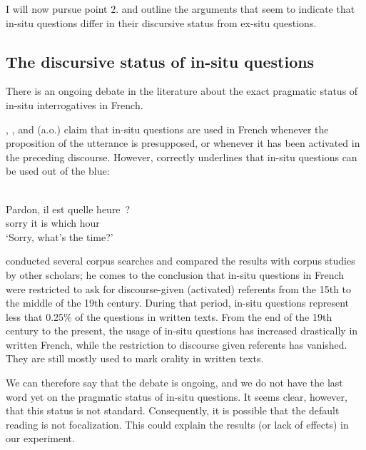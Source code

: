 I will now pursue point 2. and outline the arguments that seem to indicate that in-situ questions differ in their discursive status from ex-situ questions.

\subsection{The discursive status of in-situ questions}

There is an ongoing debate in the literature about the exact pragmatic status of in-situ interrogatives in French. 

\citet{Coveney.1996}, \citet{Boeckx.1999}, \citet{Cheng.2000} and \citet{Beyssade.2006} (a.o.) claim that in-situ questions are used in French whenever the proposition of the utterance is presupposed, or whenever it has been activated in the preceding discourse. However, \citet{Adli.2006} correctly underlines that in-situ questions can be used out of the blue:

\ea \citep[184]{Adli.2006}\nopagebreak\\
\gll Pardon, il est quelle heure~?\\
sorry it is which hour\\
\glt `Sorry, what's the time?'
\z 

\citet{Larrivee.2016} conducted several corpus searches and compared the results with corpus studies by other scholars; he comes to the conclusion that in-situ questions in French were restricted to ask for discourse-given (activated) referents from the 15th to the middle of the 19th century. During that period, in-situ questions represent less that 0.25\% of the questions in written texts. From the end of the 19th century to the present, the usage of in-situ questions has increased drastically in written French, while the restriction to discourse given referents has vanished. They are still mostly used to mark orality in written texts.  

We can therefore say that the debate is ongoing, and we do not have the last word yet on the pragmatic status of in-situ questions. It seems clear, however, that this status is not standard. Consequently, it is possible that the default reading is not focalization. This could explain the results (or lack of effects) in our experiment.
